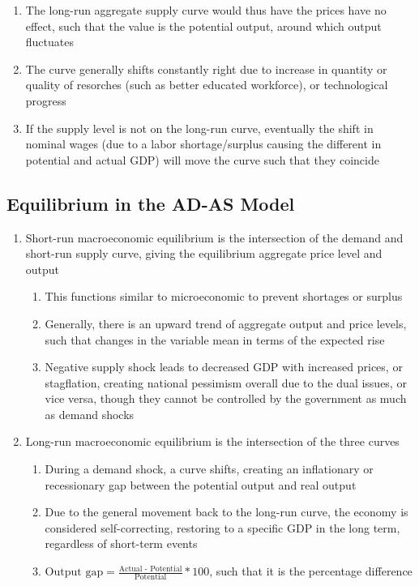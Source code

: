\documentclass[11 pt, twoside]{article}
\begin{document}
\begin{enumerate}
\begin{enumerate}
\item The long-run aggregate supply curve would thus have the prices have no effect, such that the value is the potential output, around which output fluctuates
\item The curve generally shifts constantly right due to increase in quantity or quality of resorches (such as better educated workforce), or technological progress
\item If the supply level is not on the long-run curve, eventually the shift in nominal wages (due to a labor shortage/surplus causing the different in potential and actual GDP) will move the curve such that they coincide
\end{enumerate}
\end{enumerate}

\subsection{Equilibrium in the AD-AS Model}
\begin{enumerate}
\item Short-run macroeconomic equilibrium is the intersection of the demand and short-run supply curve, giving the equilibrium aggregate price level and output
\begin{enumerate}
\item This functions similar to microeconomic to prevent shortages or surplus
\item Generally, there is an upward trend of aggregate output and price levels, such that changes in the variable mean in terms of the expected rise
\item Negative supply shock leads to decreased GDP with increased prices, or stagflation, creating national pessimism overall due to the dual issues, or vice versa, though they cannot be controlled by the government as much as demand shocks 
\end{enumerate}
\item Long-run macroeconomic equilibrium is the intersection of the three curves 
\begin{enumerate}
\item During a demand shock, a curve shifts, creating an inflationary or recessionary gap between the potential output and real output
\item Due to the general movement back to the long-run curve, the economy is considered self-correcting, restoring to a specific GDP in the long term, regardless of short-term events
\item $\text{Output gap} = \frac{\text{Actual - Potential}}{\text{Potential}}*100$, such that it is the percentage difference
\end{enumerate}
\end{enumerate}
\end{document}
